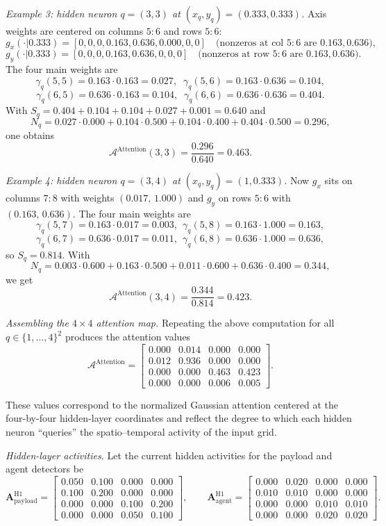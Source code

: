 \emph{Example 3: hidden neuron $q=(3,3)$ at $(x_q,y_q)=(0.333,0.333)$.}
Axis weights are centered on columns $5{:}6$ and rows $5{:}6$:
\[
g_x(\cdot|0.333)=[0,0,0,0.163,0.636,0.000,0,0]
\quad\text{(nonzeros at col $5{:}6$ are $0.163,0.636$)},
\]
\[
g_y(\cdot|0.333)=[0,0,0,0.163,0.636,0,0,0]
\quad\text{(nonzeros at row $5{:}6$ are $0.163,0.636$)}.
\]
The four main weights are
\[
\gamma_{q}(5,5)=0.163\cdot 0.163=0.027,\;\;
\gamma_{q}(5,6)=0.163\cdot 0.636=0.104,\]
\[
\gamma_{q}(6,5)=0.636\cdot 0.163=0.104,\;\;
\gamma_{q}(6,6)=0.636\cdot 0.636=0.404.
\]
With $S_q= 0.404+0.104+0.104+0.027+0.001=0.640$ and
\[
N_q=0.027\cdot 0.000+0.104\cdot 0.500+0.104\cdot 0.400+0.404\cdot 0.500=0.296,
\]
one obtains
\[
\mathcal{A}^{\text{Attention}}(3,3)=\frac{0.296}{0.640}=0.463.
\]

\emph{Example 4: hidden neuron $q=(3,4)$ at $(x_q,y_q)=(1,0.333)$.}
Now $g_x$ sits on columns $7{:}8$ with weights $(0.017,\,1.000)$ and $g_y$ on rows $5{:}6$ with $(0.163,\,0.636)$. The four main weights are
\[
\gamma_{q}(5,7)=0.163\cdot 0.017=0.003,\ \ \gamma_{q}(5,8)=0.163\cdot 1.000=0.163,
\]
\[
\gamma_{q}(6,7)=0.636\cdot 0.017=0.011,\ \ \gamma_{q}(6,8)=0.636\cdot 1.000=0.636,
\]
so $S_q= 0.814$. With
\[
N_q=0.003\cdot 0.600+0.163\cdot 0.500+0.011\cdot 0.600+0.636\cdot 0.400=0.344,
\]
we get
\[
\mathcal{A}^{\text{Attention}}(3,4)=\frac{0.344}{0.814}=0.423.
\]

\emph{Assembling the $4\times4$ attention map.}
Repeating the above computation for all
$q \in \{1,\dots,4\}^2$ produces the attention values
\[
\mathcal{A}^{\text{Attention}} =
\begin{bmatrix}
0.000 & 0.014 & 0.000 & 0.000 \\
0.012 & 0.936 & 0.000 & 0.000 \\
0.000 & 0.000 & 0.463 & 0.423 \\
0.000 & 0.000 & 0.006 & 0.005
\end{bmatrix}.
\]

These values correspond to the normalized Gaussian attention centered at
the four-by-four hidden-layer coordinates and reflect the degree to which each
hidden neuron ``queries'' the spatio–temporal activity of the input grid.

\emph{Hidden-layer activities.}
Let the current hidden activities for the payload and agent detectors be
\[
\mathbf{A}^{\text{H1}}_{\text{payload}}=
\begin{bmatrix}
0.050 & 0.100 & 0.000 & 0.000\\
0.100 & 0.200 & 0.000 & 0.000\\
0.000 & 0.000 & 0.100 & 0.200\\
0.000 & 0.000 & 0.050 & 0.100
\end{bmatrix},
\qquad
\mathbf{A}^{\text{H1}}_{\text{agent}}=
\begin{bmatrix}
0.000 & 0.020 & 0.000 & 0.000\\
0.010 & 0.010 & 0.000 & 0.000\\
0.000 & 0.000 & 0.010 & 0.010\\
0.000 & 0.000 & 0.020 & 0.020
\end{bmatrix}.
\]

